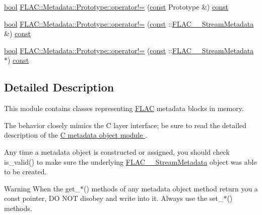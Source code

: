 \begin{DoxyCompactItemize}
\item 
\hyperlink{mac_2config_2i386_2lib-src_2libsoxr_2soxr-config_8h_abb452686968e48b67397da5f97445f5b}{bool} \hyperlink{group__flacpp__metadata__object_ga54a7ff9432ea6e2ec6fccde29df97e7d}{F\+L\+A\+C\+::\+Metadata\+::\+Prototype\+::operator!=} (\hyperlink{getopt1_8c_a2c212835823e3c54a8ab6d95c652660e}{const} Prototype \&) \hyperlink{getopt1_8c_a2c212835823e3c54a8ab6d95c652660e}{const} 
\item 
\hyperlink{mac_2config_2i386_2lib-src_2libsoxr_2soxr-config_8h_abb452686968e48b67397da5f97445f5b}{bool} \hyperlink{group__flacpp__metadata__object_gaf946e496c12c9ba30ce729dd76f8555b}{F\+L\+A\+C\+::\+Metadata\+::\+Prototype\+::operator!=} (\hyperlink{getopt1_8c_a2c212835823e3c54a8ab6d95c652660e}{const} \+::\hyperlink{struct_f_l_a_c_____stream_metadata}{F\+L\+A\+C\+\_\+\+\_\+\+Stream\+Metadata} \&) \hyperlink{getopt1_8c_a2c212835823e3c54a8ab6d95c652660e}{const} 
\item 
\hyperlink{mac_2config_2i386_2lib-src_2libsoxr_2soxr-config_8h_abb452686968e48b67397da5f97445f5b}{bool} \hyperlink{group__flacpp__metadata__object_ga3ecae6a5b7caf789c484b86da262e7f7}{F\+L\+A\+C\+::\+Metadata\+::\+Prototype\+::operator!=} (\hyperlink{getopt1_8c_a2c212835823e3c54a8ab6d95c652660e}{const} \+::\hyperlink{struct_f_l_a_c_____stream_metadata}{F\+L\+A\+C\+\_\+\+\_\+\+Stream\+Metadata} $\ast$) \hyperlink{getopt1_8c_a2c212835823e3c54a8ab6d95c652660e}{const} 
\end{DoxyCompactItemize}


\subsection{Detailed Description}
This module contains classes representing \hyperlink{namespace_f_l_a_c}{F\+L\+AC} metadata blocks in memory.

The behavior closely mimics the C layer interface; be sure to read the detailed description of the \hyperlink{group__flac__metadata__object}{C metadata object module }.

Any time a metadata object is constructed or assigned, you should check is\+\_\+valid() to make sure the underlying \hyperlink{struct_f_l_a_c_____stream_metadata}{F\+L\+A\+C\+\_\+\+\_\+\+Stream\+Metadata} object was able to be created.

\begin{DoxyWarning}{Warning}
When the get\+\_\+$\ast$() methods of any metadata object method return you a const pointer, DO N\+OT disobey and write into it. Always use the set\+\_\+$\ast$() methods. 
\end{DoxyWarning}


